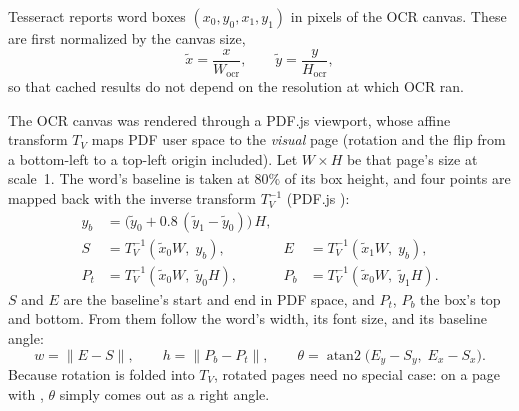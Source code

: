 \begin{center}
\end{center}

Tesseract reports word boxes $(x_0,y_0,x_1,y_1)$ in pixels of the OCR canvas.
These are first normalized by the canvas size,
\begin{equation}
  \tilde{x} = \frac{x}{W_{\text{ocr}}},\qquad
  \tilde{y} = \frac{y}{H_{\text{ocr}}},
  \label{eq:normalize}
\end{equation}
so that cached results do not depend on the resolution at which OCR ran.

The OCR canvas was rendered through a PDF.js viewport, whose affine transform
$T_V$ maps PDF user space to the \emph{visual} page (rotation and the flip from a
bottom-left to a top-left origin included). Let $W \times H$ be that page's size
at scale~1. The word's baseline is taken at $80\%$ of its box height, and four
points are mapped back with the inverse transform $T_V^{-1}$ (PDF.js
):
\begin{equation}
\begin{aligned}
  y_b &= \bigl(\tilde{y}_0 + 0.8\,(\tilde{y}_1-\tilde{y}_0)\bigr)\,H, \\
  S &= T_V^{-1}(\tilde{x}_0 W,\; y_b), &
  E &= T_V^{-1}(\tilde{x}_1 W,\; y_b), \\
  P_t &= T_V^{-1}(\tilde{x}_0 W,\; \tilde{y}_0 H), &
  P_b &= T_V^{-1}(\tilde{x}_0 W,\; \tilde{y}_1 H).
\end{aligned}
\label{eq:points}
\end{equation}
$S$ and $E$ are the baseline's start and end in PDF space, and $P_t$, $P_b$ the
box's top and bottom. From them follow the word's width, its font size, and its
baseline angle:
\begin{equation}
  w = \lVert E - S \rVert, \qquad
  h = \lVert P_b - P_t \rVert, \qquad
  \theta = \operatorname{atan2}\bigl(E_y - S_y,\; E_x - S_x\bigr).
  \label{eq:angle}
\end{equation}
Because rotation is folded into $T_V$, rotated pages need no special case: on a
page with , $\theta$ simply comes out as a right angle.

